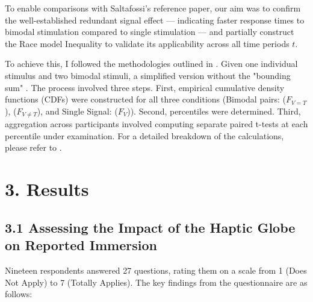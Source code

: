 \documentclass[12pt,oneside,openright]{report}
\begin{document}
To enable comparisons with Saltafossi's reference paper, our aim was to confirm the well-established redundant signal effect — indicating faster response times to bimodal stimulation compared to single stimulation — and partially construct the Race model Inequality to validate its applicability across all time periods $t$.

To achieve this, I followed the methodologies outlined in \cite{Ulrich2007,Innes2019ACA}. Given one individual stimulus and two bimodal stimuli, a simplified version without the "bounding sum" . The process involved three steps. First, empirical cumulative density functions (CDFs) were constructed for all three conditions (Bimodal pairs: ($F_{V=T}$), ($F_{V \neq T}$), and Single Signal: ($F_V$)). Second, percentiles were determined. Third, aggregation across participants involved computing separate paired t-tests at each percentile under examination. For a detailed breakdown of the calculations, please refer to \cite{Ulrich2007}.

\section*{3. Results}
\subsection*{3.1 Assessing the Impact of the Haptic Globe on Reported Immersion}
    
    Nineteen respondents answered 27 questions, rating them on a scale from 1 (Does Not Apply) to 7 (Totally Applies). The key findings from the questionnaire are as follows:
    
\end{document}
